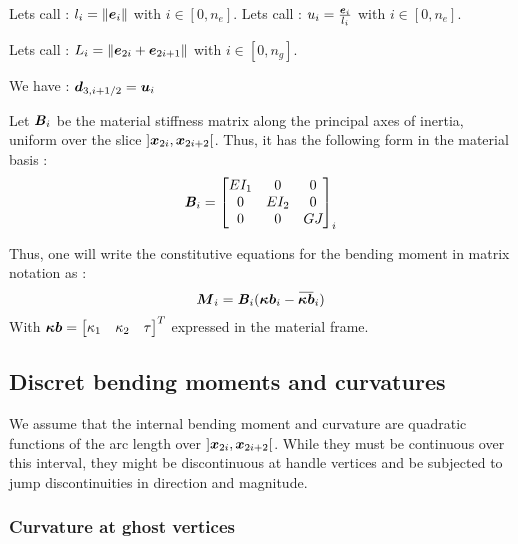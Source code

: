 Lets call : $l_i = \lVert\boldsymbol{e}_{i}\rVert$ with $i \in [0,n_e]$.
Lets call : $u_i = \frac{\boldsymbol{e}_{i}}{l_i}$ with $i \in [0,n_e]$.


Lets call : $L_i = \lVert\boldsymbol{e}_{2i} + \boldsymbol{e}_{2i+1}\rVert$ with $i \in [0,n_g]$.

We have : $\boldsymbol{d}_{3, i+1/2} = \boldsymbol{u}_i$

Let $\boldsymbol{\mathit{B}}_i$ be the material stiffness matrix along the principal axes of inertia, uniform over the slice $]\boldsymbol{x}_{2i},  \boldsymbol{x}_{2i+2}[$. Thus, it has the following form in the material basis :
\begin{equation}
	\boldsymbol{\mathit{B}}_i = \begin{bmatrix}
			EI_1		&	0		&	0		\\
			0		&	EI_{2}	&	0		\\
			0		&	0		&	GJ_{}	\\
		\end{bmatrix}_i
\end{equation}

Thus, one will write the constitutive equations for the bending moment in matrix notation as :
\begin{equation}
	\vect{M}_i =  \mat{B}_{i}(\vect{\kappa b}_{i} - \overbar{\vect{\kappa b}}_{i})
\end{equation}
With $\boldsymbol{\kappa b} = \begin{bmatrix}\kappa_1 & \kappa_2 & \tau \end{bmatrix}^T$ expressed in the material frame.


\subsection{Discret bending moments and curvatures}
We assume that the internal bending moment and curvature are quadratic functions of the arc length over $]\boldsymbol{x}_{2i},  \boldsymbol{x}_{2i+2}[$.
While they must be continuous over this interval, they might be discontinuous at handle vertices and be subjected to jump discontinuities in direction and magnitude.

\clearpage

\def\tabularxcolumn#1{m{#1}} %
\subsubsection{Curvature at ghost vertices}

